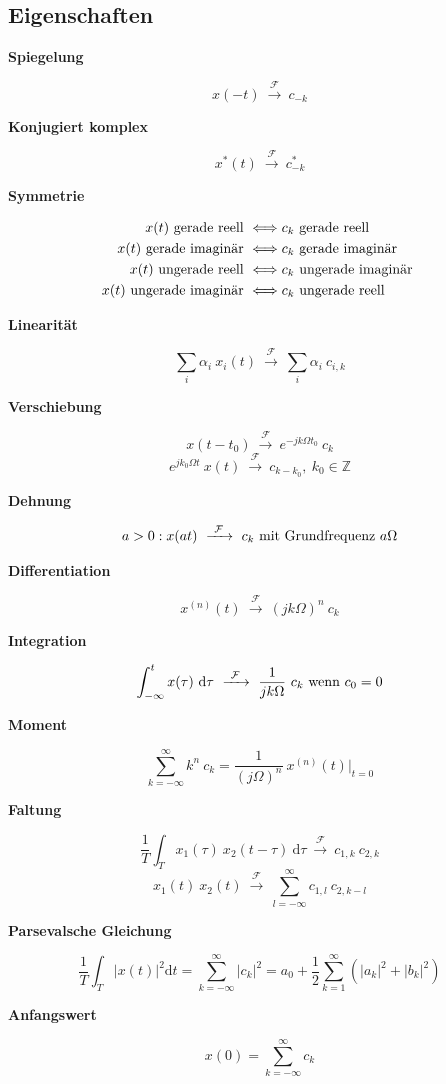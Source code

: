 \documentclass[10pt,a4paper]{article}
\newcommand{\fancyformula}[2]{
	\small
	\raggedright\sffamily\textbf{#1}
	#2
}
\newcommand{\ftransform}{
	~\xrightarrow{~\mathcal{F}~}~
}
\begin{document}
\subsection*{Eigenschaften}
\begin{multicols}{2}
\fancyformula{Spiegelung}{
	\[ x(-t)  \ftransform c_{-k} \]
}

\fancyformula{Konjugiert komplex}{
	\[ x^*(t)  \ftransform c^*_{-k} \]
}

\fancyformula{Symmetrie}{
 \begin{align*}
	x(t) \textnormal{ gerade reell } &\Longleftrightarrow c_k \textnormal{ gerade reell } \\
	x(t) \textnormal{ gerade imaginär } &\Longleftrightarrow c_k \textnormal{ gerade imaginär } \\
	x(t) \textnormal{ ungerade reell } &\Longleftrightarrow c_k \textnormal{ ungerade imaginär } \\
	x(t) \textnormal{ ungerade imaginär } &\Longleftrightarrow c_k \textnormal{ ungerade reell }
\end{align*}
}

\fancyformula{Linearität}{
	\[ \sum_i \alpha_i ~ x_i(t) \ftransform \sum_i \alpha_i ~ c_{i, k} \]
}

\fancyformula{Verschiebung}{
	\[ x(t - t_0) \ftransform e^{-jk\Omega t_0} ~ c_k \]
	\[ e^{jk_0\Omega t} ~ x(t) \ftransform c_{k-k_0}, ~ k_0 \in \mathbb Z \]
}

\fancyformula{Dehnung}{
	\[ a > 0: x(at) \ftransform c_k \textnormal{ mit Grundfrequenz } a\Omega \]
}

\fancyformula{Differentiation}{
	\[ x^{(n)}(t) \ftransform (jk\Omega)^n ~ c_k \]
}

\fancyformula{Integration}{
	\[ \int_{-\infty}^t x(\tau) ~ \mathrm d\tau \ftransform \frac{1}{jk\Omega} ~ c_k \textnormal{ wenn } c_0 = 0 \]
}

\fancyformula{Moment}{
	\[ \sum_{k=-\infty}^\infty k^n ~ c_k = \frac{1}{(j\Omega)^n} ~ x^{(n)}(t) \bigg|_{t=0} \]
}

\fancyformula{Faltung}{
	\[ \frac{1}{T} \int_T x_1(\tau) ~ x_2(t - \tau) ~ \mathrm d\tau \ftransform c_{1,k} ~ c_{2, k} \]
	\[ x_1(t) ~ x_2(t) \ftransform \sum_{l=-\infty}^{\infty} c_{1, l} ~ c_{2, k - l} \]
}

\fancyformula{Parsevalsche Gleichung}{
	\[ \frac{1}{T} \int_T |x(t)|^2 \mathrm dt = \sum_{k = -\infty}^{\infty} |c_k|^2 = a_0 + \frac{1}{2} \sum_{k=1}^{\infty} \left(|a_k|^2 + |b_k|^2 \right) \]
}
\fancyformula{Anfangswert}{
	\[ x(0) = \sum_{k=-\infty}^{\infty} c_k \]
}
\end{multicols}
\end{document}
